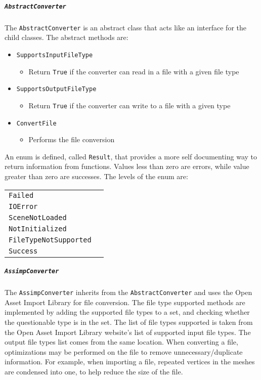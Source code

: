     \subparagraph{\texttt{AbstractConverter}}
    \hfill \break
    The \texttt{AbstractConverter} is an abstract class that acts like an interface for the child classes.  The abstract methods are:
    \begin{itemize}
        \item \texttt{SupportsInputFileType}
        \begin{itemize}
            \item Return \texttt{True} if the converter can read in a file with a given file type
        \end{itemize}

        \item \texttt{SupportsOutputFileType}
        \begin{itemize}
            \item Return \texttt{True} if the converter can write to a file with a given type
        \end{itemize}

        \item \texttt{ConvertFile}
        \begin{itemize}
            \item Performs the file conversion
        \end{itemize}
    \end{itemize}

    An enum is defined, called \texttt{Result}, that provides a more self documenting way to return information from functions.  Values less than zero are errors, while
    value greater than zero are successes.  The levels of the enum are:
    
    \begin{tabular}{l l}
        \centering
        \texttt{Failed} &\\
        \texttt{IOError} &\\
        \texttt{SceneNotLoaded} &\\
        \texttt{NotInitialized} &\\
        \texttt{FileTypeNotSupported} &\\
        \texttt{Success} &
    \end{tabular}

    \subparagraph{\texttt{AssimpConverter}}
    \hfill \break
    The \texttt{AssimpConverter} inherits from the \texttt{AbstractConverter} and uses the Open Asset Import Library for file conversion.  
    The file type supported methods are implemented by adding the supported file types to a set, and checking whether the questionable type is in the set.
    The list of file types supported is taken from the Open Asset Import Library website's list of supported input file types.  
    The output file types list comes from the same location.
    When converting a file, optimizations may be performed on the file to remove unnecessary/duplicate information.  For example, when importing a file, 
    repeated vertices in the meshes are condensed into one, to help reduce the size of the file.

